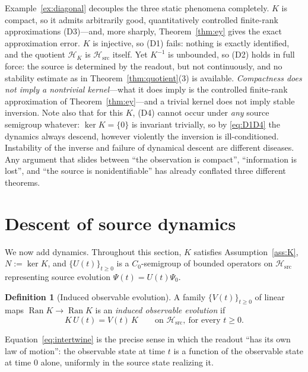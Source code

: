 \documentclass[11pt,reqno]{amsart}
\numberwithin{equation}{section}
\theoremstyle{plain}
\theoremstyle{definition}
\newtheorem{definition}[theorem]{Definition}
\theoremstyle{remark}
\newcommand{\Hsrc}{\mathcal{H}_{\mathrm{src}}}
\newcommand{\HK}{\mathcal{H}_{K}}
\newcommand{\Ran}{\operatorname{Ran}}
\begin{document}
Example~\ref{ex:diagonal} decouples the three static phenomena completely. $K$ is compact,
so it admits arbitrarily good, quantitatively controlled finite-rank approximations
(D3)---and, more sharply, Theorem~\ref{thm:ey} gives the exact approximation error. $K$ is
injective, so (D1) fails: nothing is exactly identified, and the quotient $\HK$ is
$\Hsrc$ itself. Yet $K^{-1}$ is unbounded, so (D2) holds in full force: the source is
determined by the readout, but not continuously, and no stability estimate as in
Theorem~\ref{thm:quotient}(3) is available. \emph{Compactness does not imply a nontrivial
kernel}---what it does imply is the controlled finite-rank approximation of
Theorem~\ref{thm:ey}---and a trivial kernel does not imply stable inversion. Note also that
for this $K$, (D4) cannot occur under \emph{any} source semigroup whatever: $\ker K=\{0\}$ is
invariant trivially, so by \eqref{eq:D1D4} the dynamics always descend, however violently the
inversion is ill-conditioned. Instability of the inverse and failure of dynamical descent are
different diseases. Any argument that slides between ``the observation is compact'',
``information is lost'', and ``the source is nonidentifiable'' has already conflated three
different theorems.

\section{Descent of source dynamics}
\label{sec:descent}

We now add dynamics. Throughout this section, $K$ satisfies Assumption~\ref{ass:K},
$N:=\ker K$, and $\{U(t)\}_{t\ge0}$ is a $C_{0}$-semigroup of bounded operators on $\Hsrc$
representing source evolution $\Psi(t)=U(t)\Psi_{0}$.

\begin{definition}[Induced observable evolution]
\label{def:induced}
A family $\{V(t)\}_{t\ge0}$ of linear maps $\Ran K\to\Ran K$ is an \emph{induced observable
evolution} if
\begin{equation}
\label{eq:intertwine}
K\,U(t)=V(t)\,K
\qquad\text{on }\Hsrc,\ \text{for every }t\ge0 .
\end{equation}
\end{definition}

Equation~\eqref{eq:intertwine} is the precise sense in which the readout ``has its own law
of motion'': the observable state at time $t$ is a function of the observable state at time
$0$ alone, uniformly in the source state realizing it.
\end{document}
